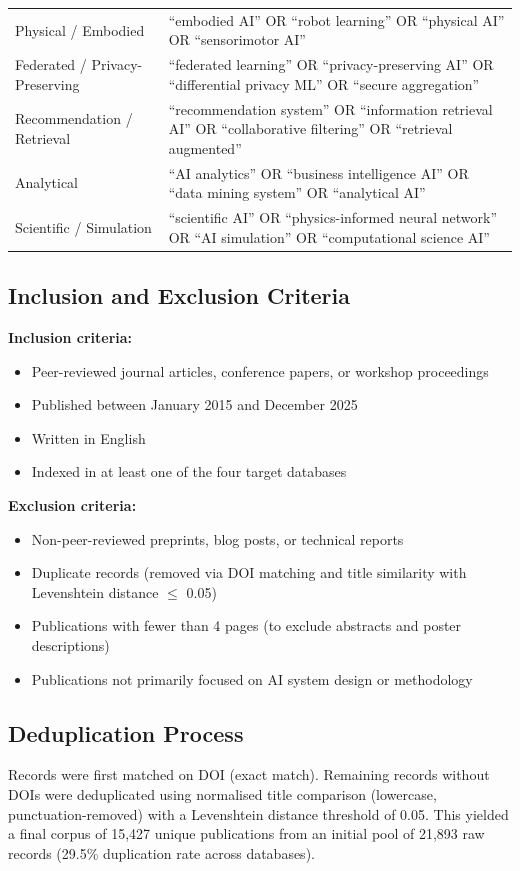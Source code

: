 \documentclass[acmlarge]{acmart}
\begin{document}
\begin{table}[ht]
\begin{tabular}{@{}lp{10cm}@{}}
Physical / Embodied & ``embodied AI'' OR ``robot learning'' OR ``physical AI'' OR ``sensorimotor AI'' \\
Federated / Privacy-Preserving & ``federated learning'' OR ``privacy-preserving AI'' OR ``differential privacy ML'' OR ``secure aggregation'' \\
Recommendation / Retrieval & ``recommendation system'' OR ``information retrieval AI'' OR ``collaborative filtering'' OR ``retrieval augmented'' \\
Analytical & ``AI analytics'' OR ``business intelligence AI'' OR ``data mining system'' OR ``analytical AI'' \\
Scientific / Simulation & ``scientific AI'' OR ``physics-informed neural network'' OR ``AI simulation'' OR ``computational science AI'' \\
\bottomrule
\end{tabular}
\end{table}

\subsection{Inclusion and Exclusion Criteria}

\textbf{Inclusion criteria:}
\begin{itemize}
  \item Peer-reviewed journal articles, conference papers, or workshop proceedings
  \item Published between January 2015 and December 2025
  \item Written in English
  \item Indexed in at least one of the four target databases
\end{itemize}

\textbf{Exclusion criteria:}
\begin{itemize}
  \item Non-peer-reviewed preprints, blog posts, or technical reports
  \item Duplicate records (removed via DOI matching and title similarity with Levenshtein distance $\leq$ 0.05)
  \item Publications with fewer than 4 pages (to exclude abstracts and poster descriptions)
  \item Publications not primarily focused on AI system design or methodology
\end{itemize}

\subsection{Deduplication Process}
Records were first matched on DOI (exact match). Remaining records without DOIs were deduplicated using normalised title comparison (lowercase, punctuation-removed) with a Levenshtein distance threshold of 0.05. This yielded a final corpus of 15,427 unique publications from an initial pool of 21,893 raw records (29.5\% duplication rate across databases).
\end{document}
